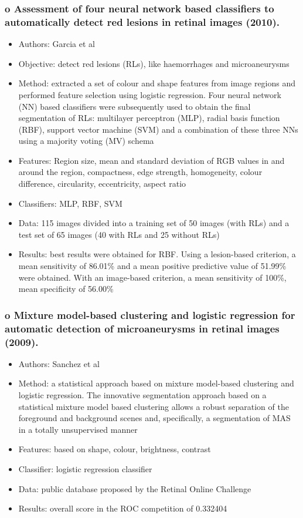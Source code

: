 \documentclass[12pt]{report}
\begin{document}
\subsubsection{o   Assessment of four neural network based classifiers to automatically detect red lesions in retinal images (2010). \cite{garcia2010assessment}}
\begin{itemize}
\item Authors: Garcia et al
\item Objective: detect red lesions (RLs), like haemorrhages and microaneurysms
\item Method: extracted a set of colour and shape features from image regions and performed feature selection using logistic regression. Four neural network (NN) based classifiers were subsequently used to obtain the final segmentation of RLs: multilayer perceptron (MLP), radial basis function (RBF), support vector machine (SVM) and a combination of these three NNs using a majority voting (MV) schema
\item Features: Region size, mean and standard deviation of RGB values in and around the region, compactness, edge strength, homogeneity, colour difference, circularity, eccentricity, aspect ratio
\item Classifiers: MLP, RBF, SVM
\item Data: 115 images divided into a training set of 50 images (with RLs) and a test set of 65 images (40 with RLs and 25 without RLs)
\item Results: best results were obtained for RBF. Using a lesion-based criterion, a mean sensitivity of 86.01\% and a mean positive predictive value of 51.99\% were obtained. With an image-based criterion, a mean sensitivity of 100\%, mean specificity of 56.00\%
\end{itemize}

\subsubsection{o   Mixture model-based clustering and logistic regression for automatic detection of microaneurysms in retinal images (2009). \cite{sanchez2009mixture}}
\begin{itemize}
\item Authors: Sanchez et al
\item Method: a statistical approach based on mixture model-based clustering and logistic regression. The innovative segmentation approach based on a statistical mixture model based clustering allows a robust separation of the foreground and background scenes and, specifically, a segmentation of MAS in a totally unsupervised manner
\item Features: based on shape, colour, brightness, contrast
\item Classifier: logistic regression classifier
\item Data: public database proposed by the Retinal Online Challenge
\item Results: overall score in the ROC competition of 0.332404
\end{itemize}
\end{document}
